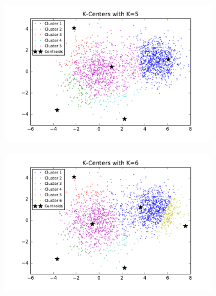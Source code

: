 \begin{figure}[htb]
\begin{subfigure}[b]{0.475\textwidth}
        \end{subfigure}
        \begin{subfigure}[b]{0.475\textwidth}  
            \centering 
            \includegraphics[width=\textwidth]{./figures/clustering_kCenter_5.pdf}
        \end{subfigure}
        \hfill
        \begin{subfigure}[b]{0.475\textwidth}   
            \centering 
            \includegraphics[width=\textwidth]{./figures/clustering_kCenter_6.pdf}
        \end{subfigure}
        \begin{subfigure}[b]{0.475\textwidth}   
            \centering 

\end{subfigure}
\end{figure}

